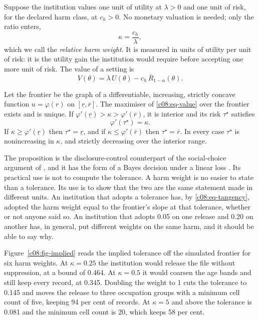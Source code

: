 Suppose the institution values one unit of utility at $\lambda > 0$ and one unit of
risk, for the declared harm class, at $c_h > 0$. No monetary valuation is needed;
only the ratio enters,
\[
\kappa = \frac{c_h}{\lambda},
\]
which we call the \emph{relative harm weight}. It is measured in units of utility per
unit of risk: it is the utility gain the institution would require before accepting
one more unit of risk. The value of a setting is
\begin{equation}\label{c08:eq-value}
V(\theta) = \lambda\,U(\theta) - c_h\,\overline{R}_{1-\alpha}(\theta) .
\end{equation}

\begin{proposition}\label{c08:prop-tau}
Let the frontier be the graph of a differentiable, increasing, strictly concave
function $u = \varphi(r)$ on $[\underline{r}, \overline{r}]$. The maximiser of
\eqref{c08:eq-value} over the frontier exists and is unique. If
$\varphi'(\underline{r}) > \kappa > \varphi'(\overline{r})$, it is interior and its
risk $\tau^\star$ satisfies
\begin{equation}\label{c08:eq-tangency}
\varphi'(\tau^\star) = \kappa .
\end{equation}
If $\kappa \ge \varphi'(\underline{r})$ then $\tau^\star = \underline{r}$, and if
$\kappa \le \varphi'(\overline{r})$ then $\tau^\star = \overline{r}$. In every case
$\tau^\star$ is nonincreasing in $\kappa$, and strictly decreasing over the interior
range.
\end{proposition}

The proposition is the disclosure-control counterpart of the social-choice argument
of \citet{abowd2019}, and it has the form of a Bayes decision under a linear loss
\citep{berger1985}. Its practical use is not to compute the tolerance. A harm weight
is no easier to state than a tolerance. Its use is to show that the two are the same
statement made in different units. An institution that adopts a tolerance has, by
\eqref{c08:eq-tangency}, adopted the harm weight equal to the frontier's slope at
that tolerance, whether or not anyone said so. An institution that adopts 0.05 on
one release and 0.20 on another has, in general, put different weights on the same
harm, and it should be able to say why.

Figure~\ref{c08:fig-implied} reads the implied tolerance off the simulated frontier
for six harm weights. At $\kappa = 0.25$ the institution would release the file
without suppression, at a bound of 0.464. At $\kappa = 0.5$ it would coarsen the age
bands and still keep every record, at 0.345. Doubling the weight to 1 cuts the
tolerance to 0.145 and moves the release to three occupation groups with a minimum
cell count of five, keeping 94 per cent of records. At $\kappa = 5$ and above the
tolerance is 0.081 and the minimum cell count is 20, which keeps 58 per cent.

